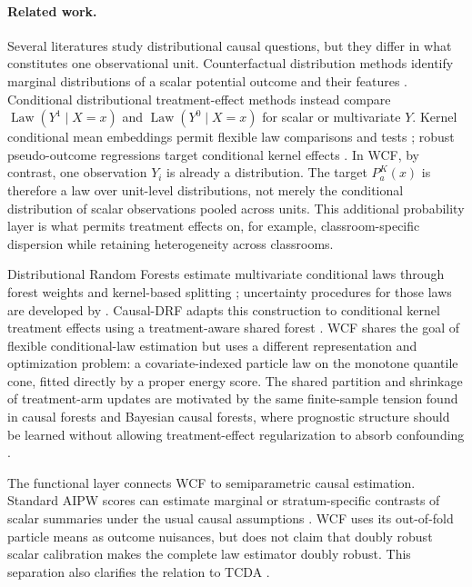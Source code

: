 \documentclass[twoside]{article}
\newcommand{\Law}{\operatorname{Law}}
\begin{document}
\paragraph{Related work.}

Several literatures study distributional causal questions, but they differ in what constitutes one observational unit. Counterfactual distribution methods identify marginal distributions of a scalar potential outcome and their features \citep{Chernozhukov2013}. Conditional distributional treatment-effect methods instead compare $\Law(Y^1\mid X=x)$ and $\Law(Y^0\mid X=x)$ for scalar or multivariate $Y$. Kernel conditional mean embeddings permit flexible law comparisons and tests \citep{Counterfactualmeanembeddings,CATEGeneralization,martineztaboada2023efficient,jain2026conditional}; robust pseudo-outcome regressions target conditional kernel effects \citep{GRFDistributionalCausalEffects}. In WCF, by contrast, one observation $Y_i$ is already a distribution. The target $P_a^K(x)$ is therefore a law over unit-level distributions, not merely the conditional distribution of scalar observations pooled across units. This additional probability layer is what permits treatment effects on, for example, classroom-specific dispersion while retaining heterogeneity across classrooms.

Distributional Random Forests estimate multivariate conditional laws through forest weights and kernel-based splitting \citep{DRF-paper}; uncertainty procedures for those laws are developed by \citet{naf2023confidence}. Causal-DRF adapts this construction to conditional kernel treatment effects using a treatment-aware shared forest \citep{naf2026causaldrf}. WCF shares the goal of flexible conditional-law estimation but uses a different representation and optimization problem: a covariate-indexed particle law on the monotone quantile cone, fitted directly by a proper energy score. The shared partition and shrinkage of treatment-arm updates are motivated by the same finite-sample tension found in causal forests and Bayesian causal forests, where prognostic structure should be learned without allowing treatment-effect regularization to absorb confounding \citep{wager2018estimation,athey2019generalized,hahn2020bayesian}.

The functional layer connects WCF to semiparametric causal estimation. Standard AIPW scores can estimate marginal or stratum-specific contrasts of scalar summaries under the usual causal assumptions \citep{bang2005doubly,chernozhukov2018double}. WCF uses its out-of-fold particle means as outcome nuisances, but does not claim that doubly robust scalar calibration makes the complete law estimator doubly robust. This separation also clarifies the relation to TCDA \citep{souto_diamantis_tcda_2026}.
\end{document}
